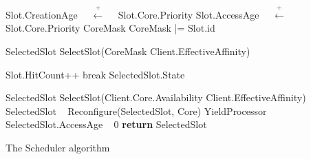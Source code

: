 \begin{algorithm}
\begin{algorithmic}[1]

	
		\State Slot.CreationAge ~~$\xleftarrow{\text{+}}$~~ Slot.Core.Priority\;
		\State Slot.AccessAge ~~$\xleftarrow{\text{+}}$~~ Slot.Core.Priority\;
	\EndIf
\EndFor
\State
\Repeat
	\State CoreMask \;
			
			\State CoreMask |= Slot.id\;
		\EndIf
	\EndFor

	\State SelectedSlot \gets SelectSlot(CoreMask
	 Client.EffectiveAffinity) \;

			\State Slot.HitCount++\;	
			\State break\;
		\Else
			\State SelectedSlot.State \gets ~~ \emptyset\;
		\EndIf
	\EndIf
	
	\State SelectedSlot \gets SelectSlot(Client.Core.Availability 
	 Client.EffectiveAffinity)\;
		\State SelectedSlot \gets ~ \emptyset\;
	\EndIf
	\State
		\State Reconfigure(SelectedSlot, Core)\;
	\Else
		\State YieldProcessor\;
	\EndIf
{}\;
\State
\State SelectedSlot.AccessAge \gets ~ 0\;	
\State \textbf{return} SelectedSlot\;
\EndProcedure
\end{algorithmic}
\caption{The Scheduler algorithm}
\label{lst:scheduler}
\end{algorithm}

